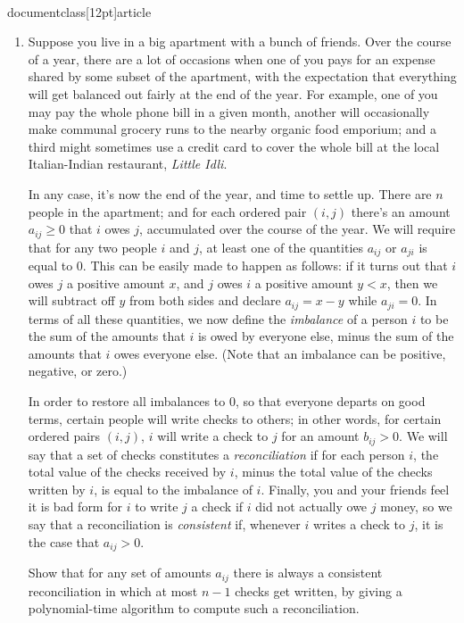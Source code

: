 \\documentclass[12pt]{article}
\begin{document}
\begin{enumerate}
{}



\item 

Suppose you live in a big apartment with a bunch of friends.
Over the course of a year, there are a lot of occasions
when one of you pays for an expense shared by some subset of the apartment,
with the expectation that everything will get balanced out fairly
at the end of the year.
For example, one of you may pay the whole phone bill in a given month,
another will occasionally make communal grocery runs to the nearby
organic food emporium; and a third might sometimes use a
credit card to cover the whole bill at the local
Italian-Indian restaurant, {\em Little Idli}.

In any case, it's now the end of the year, and time to settle up.
There are $n$ people in the apartment; and for
each ordered pair
$(i,j)$ there's an amount $a_{ij} \geq 0$ that $i$ owes $j$,
accumulated over the course of the year.
We will require that for any two people $i$ and $j$,
at least one of the quantities $a_{ij}$ or $a_{ji}$ is equal to $0$.
This can be easily made to happen as follows:
if it turns out that $i$ owes $j$ a positive amount $x$,
and $j$ owes $i$ a positive amount $y < x$, then we will
subtract off $y$ from both sides and declare $a_{ij} = x - y$
while $a_{ji} = 0$.
In terms of all these quantities, we now define the
{\em imbalance} of a person $i$ to be the sum of
the amounts that $i$ is owed by everyone else,
minus the sum of the amounts that $i$ owes everyone else.
(Note that an imbalance can be positive, negative, or zero.)

In order to restore all imbalances to $0$,
so that everyone departs on good terms,
certain people will write checks to others;
in other words, for certain ordered pairs $(i,j)$,
$i$ will write a check to $j$ for an amount $b_{ij} > 0$.
We will say that a set of checks constitutes a
{\em reconciliation} if for each person $i$,
the total value of the checks received by $i$,
minus the total value of the checks written by $i$,
is equal to the imbalance of $i$.
Finally, you and your friends feel it is bad form
for $i$ to write $j$ a check if $i$ did not actually
owe $j$ money, so we say that a reconciliation
is {\em consistent} if, whenever $i$ writes a check to $j$,
it is the case that $a_{ij} > 0$.

Show that for any set of amounts $a_{ij}$ there is
always a consistent reconciliation in which at most $n-1$ checks get written,
by giving a polynomial-time algorithm to compute such
a reconciliation.


\end{enumerate}
\end{document}
